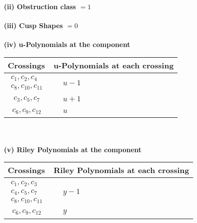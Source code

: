 \documentclass[1p]{elsarticle_modified}
\theoremstyle{definition}
\begin{document}
\flushleft \textbf{(ii) Obstruction class $= 1$}\\~\\
\flushleft \textbf{(iii) Cusp Shapes $= 0$}\\~\\
\newpage\renewcommand{\arraystretch}{1}
\flushleft \textbf{(iv) u-Polynomials at the component}\newline \\
\begin{tabular}{m{50pt}|m{274pt}}
Crossings & \hspace{64pt}u-Polynomials at each crossing \\
\hline $$\begin{aligned}c_{1},c_{2},c_{4}\\c_{8},c_{10},c_{11}\end{aligned}$$&$\begin{aligned}
&u-1
\end{aligned}$\\
\hline $$\begin{aligned}c_{3},c_{5},c_{7}\end{aligned}$$&$\begin{aligned}
&u+1
\end{aligned}$\\
\hline $$\begin{aligned}c_{6},c_{9},c_{12}\end{aligned}$$&$\begin{aligned}
&u
\end{aligned}$\\
\hline
\end{tabular}\\~\\
\newpage\renewcommand{\arraystretch}{1}
\flushleft \textbf{(v) Riley Polynomials at the component}\newline \\
\begin{tabular}{m{50pt}|m{274pt}}
Crossings & \hspace{64pt}Riley Polynomials at each crossing \\
\hline $$\begin{aligned}c_{1},c_{2},c_{3}\\c_{4},c_{5},c_{7}\\c_{8},c_{10},c_{11}\end{aligned}$$&$\begin{aligned}
&y-1
\end{aligned}$\\
\hline $$\begin{aligned}c_{6},c_{9},c_{12}\end{aligned}$$&$\begin{aligned}
&y
\end{aligned}$\\
\hline
\end{tabular}\\~\\
\end{document}
